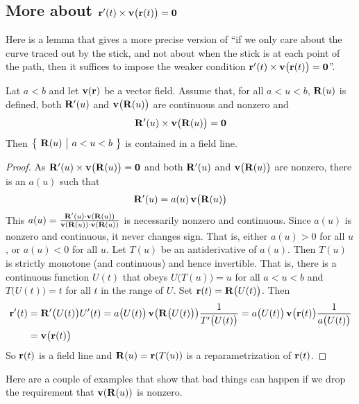 \subsection{More about $\mathbf{r}'(t)\times\mathbf{v}\big(\mathbf{r}(t)\big)=\mathbf{0}$}
            \label{sec:fieldLinePara}
Here is a lemma that gives a more precise version of
``if we only care about the curve traced out by the stick, and not about 
when the stick is at each point of the path, then it suffices to
impose the weaker condition 
$\mathbf{r}'(t)\times\mathbf{v}\big(\mathbf{r}(t)\big)=\mathbf{0}$''.
\begin{lemma}\label{lem:fieldLinePara}
Lat $a<b$ and let $\mathbf{v}(\mathbf{r})$ be a vector field. Assume that,
for all $a<u<b$,  $\mathbf{R}(u)$ is defined, both $\mathbf{R}'(u)$ and 
$\mathbf{v}\big(\mathbf{R}(u)\big)$ are continuous and  nonzero and
\begin{equation*}
\mathbf{R}'(u)\times\mathbf{v}\big(\mathbf{R}(u)\big)=\mathbf{0}
\end{equation*}
Then $\big\{ \ \mathbf{R}(u)\ \big|\ a<u<b\ \big\}$ is contained in a field line.
\end{lemma}
\begin{proof}
As $\mathbf{R}'(u)\times\mathbf{v}\big(\mathbf{R}(u)\big)=\mathbf{0}$ and  both 
$\mathbf{R}'(u)$ and $\mathbf{v}\big(\mathbf{R}(u)\big)$ are nonzero,  there is 
an $a(u)$ such that
\begin{equation*}
\mathbf{R}'(u) = a(u)\,\mathbf{v}\big(\mathbf{R}(u)\big)
\end{equation*} 
This $a(u)=\frac{\mathbf{R}'(u)\cdot\mathbf{v}(\mathbf{R}(u))}{\mathbf{v}(\mathbf{R}(u))\cdot\mathbf{v}(\mathbf{R}(u))}$ 
is necessarily nonzero and continuous. Since $a(u)$ is nonzero and continuous,
it never changes sign. That is, either $a(u)>0$ for all  $u$,
or $a(u)<0$ for all $u$. Let $T(u)$ be an antiderivative of $a(u)$. Then $T(u)$
is strictly monotone (and continuous) and hence invertible. That is, there 
is a continuous function $U(t)$ that obeys $U\big(T(u)\big)=u$ for all 
$a<u<b$ and $T\big(U(t)\big)=t$ for all $t$ in the range of $U$. Set 
$\mathbf{r}(t) = \mathbf{R}\big(U(t)\big)$.
Then
\begin{align*}
\mathbf{r}'(t) &= \mathbf{R}'\big(U(t)\big) U'(t)
        = a\big(U(t)\big)\,\mathbf{v}\big(\mathbf{R}\big(U(t)\big)\big)
                                    \frac{1}{T'\big(U(t)\big)}
        = a\big(U(t)\big)\,\mathbf{v}\big(\mathbf{r}(t)\big)
                                    \frac{1}{a\big(U(t)\big)} \\
        &=\mathbf{v}\big(\mathbf{r}(t)\big)
\end{align*}
So $\mathbf{r}(t)$ is a field line and $\mathbf{R}(u) = \mathbf{r}(T(u))$ 
is a reparametrization of $\mathbf{r}(t)$.
\end{proof}

Here are a couple of examples that show that bad things can happen
if we drop the requirement that $\mathbf{v}(\mathbf{R}(u))$ is nonzero.

